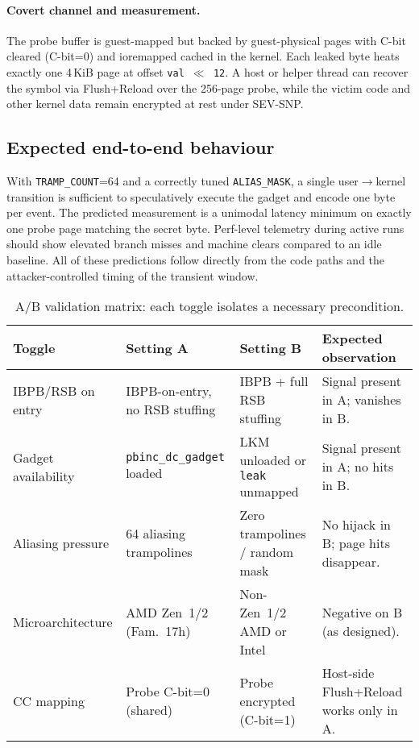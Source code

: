 \documentclass[11pt,a4paper]{article}
\begin{document}
\paragraph{Covert channel and measurement.}
The probe buffer is guest-mapped but backed by guest-physical pages with C-bit cleared (C-bit=0) and ioremapped cached in the kernel. Each leaked byte heats exactly one 4\,KiB page at offset \texttt{val $\ll$ 12}. A host or helper thread can recover the symbol via Flush+Reload over the 256-page probe, while the victim code and other kernel data remain encrypted at rest under SEV-SNP.\cite{linux_srso_doc}

\subsection{Expected end-to-end behaviour}
With \texttt{TRAMP\_COUNT}=64 and a correctly tuned \texttt{ALIAS\_MASK}, a single user$\rightarrow$kernel transition is sufficient to speculatively execute the gadget and encode one byte per event. The predicted measurement is a unimodal latency minimum on exactly one probe page matching the secret byte. Perf-level telemetry during active runs should show elevated branch misses and machine clears compared to an idle baseline. All of these predictions follow directly from the code paths and the attacker-controlled timing of the transient window.\cite{wikner2025breaking}

\begin{landscape}
\begin{table}[p]
  \centering
  \caption{A/B validation matrix: each toggle isolates a necessary precondition.}
  \label{tab:controls}
  \setlength{\tabcolsep}{8pt}
  \renewcommand{\arraystretch}{1.15}
  \begin{tabularx}{\linewidth}{@{} l l l >{\RaggedRight\arraybackslash}X @{}}
    \toprule
    \textbf{Toggle} & \textbf{Setting A} & \textbf{Setting B} & \textbf{Expected observation} \\
    \midrule
    IBPB/RSB on entry   & IBPB-on-entry, no RSB stuffing & IBPB + full RSB stuffing &
      Signal present in A; vanishes in B. \\
    Gadget availability & \texttt{pbinc\_dc\_gadget} loaded & LKM unloaded or \texttt{leak} unmapped &
      Signal present in A; no hits in B. \\
    Aliasing pressure   & 64 aliasing trampolines & Zero trampolines / random mask &
      No hijack in B; page hits disappear. \\
    Microarchitecture   & AMD Zen~1/2 (Fam.~17h) & Non-Zen~1/2 AMD or Intel &
      Negative on B (as designed). \\
    CC mapping          & Probe C-bit=0 (shared) & Probe encrypted (C-bit=1) &
      Host-side Flush+Reload works only in A. \\
    \bottomrule
  \end{tabularx}
\end{table}
\end{landscape}
\end{document}
